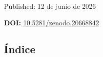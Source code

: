 \documentclass[11pt,a4paper]{article}
\begin{document}
\begin{center}
\begin{minipage}{0.82\textwidth}
\vspace{2.0cm}

{
\Large
Published: 12 de junio de 2026
\par}

\vspace{0.4cm}

{\large
\textbf{DOI:}
\href{https://doi.org/10.5281/zenodo.20668842}
     {10.5281/zenodo.20668842}
\par}

\end{minipage}
\end{center}

\vfill

\clearpage


%

\begin{center}
\section*{\Huge Índice}
\end{center}

\thispagestyle{plain}

\vspace*{1.00cm}
\end{document}
